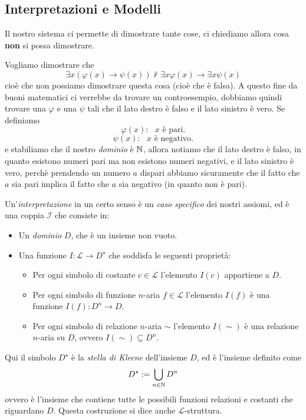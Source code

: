 \documentclass[11pt]{scrartcl}
\begin{document}
	\subsection{Interpretazioni e Modelli}
	Il nostro sistema ci permette di dimostrare tante cose, ci chiediamo allora cosa \textbf{non} si possa dimostrare.
	\begin{example}[Controesempio]
		Vogliamo dimostrare che 
		$$\exists x \left(\varphi(x)\to \psi(x)\right)\not \vdash \exists x \varphi(x)\to \exists x \psi(x)$$
		cioè che non possiamo dimostrare questa cosa (cioè che è falsa). A questo fine da buoni matematici ci verrebbe da trovare un controesempio, dobbiamo quindi trovare una $\varphi$ e una $\psi$ tali che il lato destro è falso e il lato sinistro è vero. Se definiamo
		$$\varphi (x): \text{ $x$ è pari.}$$
		$$\psi(x): \text{ $x$ è negativo.}$$
		e stabiliamo che il nostro \textit{dominio} è $\mathbb N$, allora notiamo che il lato destro è falso, in quanto esistono numeri pari ma non esistono numeri negativi, e il lato sinistro è vero, perchè prendendo un numero $a$ dispari abbiamo sicuramente che il fatto che $a$ sia pari implica il fatto che $a$ sia negativo (in quanto non è pari).
	\end{example}
	\begin{definition}[Interpretazione]
		Un'\textit{interpretazione} in un certo senso è un \textit{caso specifico} dei nostri assiomi, ed è una coppia $\mathcal{I}$ che consiste in:
		\begin{itemize}
			\item Un \textit{dominio} $D$, che è un insieme non vuoto.
			\item Una funzione $I:\mathcal{L}\to D^\star$ che soddisfa le seguenti proprietà:
			\begin{itemize}
				\item Per ogni simbolo di costante $c\in \mathcal{L}$ l'elemento $I(c)$ appartiene a $D$.
				\item Per ogni simbolo di funzione $n$-aria $f\in\mathcal{L}$ l'elemento $I(f)$ è una funzione $I(f):D^n\to D$.
				\item Per ogni simbolo di relazione $n$-aria $\sim$ l'elemento $I(\sim)$ è una relazione $n$-aria su $D$, ovvero $I(\sim)\subseteq D^n$. 
			\end{itemize}  
			
		\end{itemize}
		Qui il simbolo $D^\star$ è la \textit{stella di Kleene} dell'insieme $D$, ed è l'insieme definito come
		$$D^\star:=\bigcup_{n\in\mathbb N}D^n$$
		ovvero è l'insieme che contiene tutte le possibili funzioni relazioni e costanti che riguardano $D$. Questa costruzione si dice anche $\mathcal{L}$-struttura.
	\end{definition}
\end{document}
